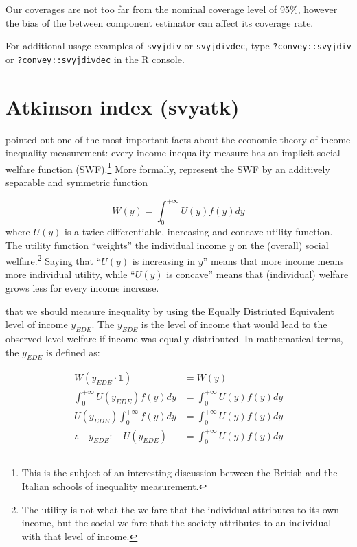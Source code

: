 \documentclass[
]{book}
\begin{document}
Our coverages are not too far from the nominal coverage level of 95\%, however the bias of the between component estimator can affect its coverage rate.

For additional usage examples of \texttt{svyjdiv} or \texttt{svyjdivdec}, type \texttt{?convey::svyjdiv} or \texttt{?convey::svyjdivdec} in the R console.

\hypertarget{atkinson-index-svyatk}{%
\section{Atkinson index (svyatk)}\label{atkinson-index-svyatk}}

\textcite{dalton1920} pointed out one of the most important facts about the economic theory
of income inequality measurement: every income inequality measure has an implicit
social welfare function (SWF).\footnote{This is the subject of an interesting discussion between the British and the Italian schools of inequality measurement.}
More formally, \textcite{atkinson1970} represent the SWF by an additively
separable and symmetric function

\[
W ( y ) = \int_0^{+\infty} U ( y ) f( y ) dy
\]
\noindent where \(U( y )\) is a twice differentiable, increasing and concave utility function.
The utility function ``weights'' the individual income \(y\) on the (overall) social welfare.\footnote{The utility is not what the welfare that the individual attributes to its own income, but the social welfare that the society attributes to an individual with that level of income.}
Saying that ``\(U ( y )\) is increasing in \(y\)'' means that more income means more individual utility,
while ``\(U ( y )\) is concave'' means that (individual) welfare grows less for every income increase.

\textcite[p.~250]{atkinson1970} that we should measure inequality by using the Equally Distriuted Equivalent level of income
\(y_{EDE}\). The \(y_{EDE}\) is the level of income that would lead to the observed level welfare if income was equally distributed.
In mathematical terms, the \(y_{EDE}\) is defined as:

\[
\begin{aligned}
W( y_{EDE} \cdot \mathbb{1} ) &= W( y ) \\
\int_0^{+\infty} U ( y_{EDE} ) f( y ) dy &= \int_0^{+\infty} U ( y ) f( y ) dy \\
U ( y_{EDE} ) \int_0^{+\infty}  f( y ) dy &= \int_0^{+\infty} U ( y ) f( y ) dy \\ 
\therefore \quad y_{EDE} :\quad U ( y_{EDE} )  &= \int_0^{+\infty} U ( y ) f( y ) dy 
\end{aligned}
\]
\end{document}
